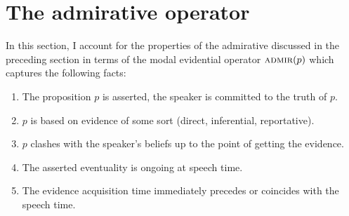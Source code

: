 \documentclass[output=paper,
colorlinks,
citecolor=brown,
newtxmath
]{langscibook}
\begin{document}
\section{The admirative operator}\label{sec:admirative-analysis}

In this section, I account for the properties of the  admirative discussed in the preceding section in terms of the modal evidential operator $\textsc{admir}(p)$ which captures the following facts:

\begin{enumerate}
\item The proposition $p$ is asserted, the speaker is committed to the truth of $p$.
\item $p$ is based on evidence of some sort (direct, inferential, reportative).
\item $p$ clashes with the speaker's beliefs up to the point of getting the evidence.
\item The asserted eventuality is ongoing at speech time.
\item The evidence acquisition time immediately precedes or coincides with the speech time. %
\end{enumerate}
\end{document}
